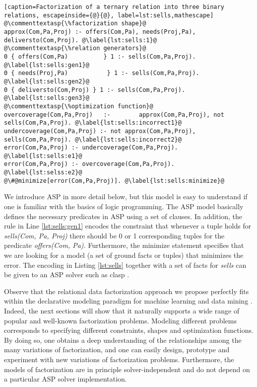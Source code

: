 \begin{lstlisting}[caption=Factorization of a ternary relation into three binary relations, escapeinside={@}{@}, label=lst:sells,mathescape] 
@\commenttextasp{\%factorization shape}@
approx(Com,Pa,Proj) :- offers(Com,Pa), needs(Proj,Pa), deliversto(Com,Proj). @\label{lst:sells:1}@
@\commenttextasp{\%relation generators}@
0 { offers(Com,Pa)          } 1 :- sells(Com,Pa,Proj). @\label{lst:sells:gen1}@
0 { needs(Proj,Pa)           } 1 :- sells(Com,Pa,Proj). @\label{lst:sells:gen2}@
0 { deliversto(Com,Proj) } 1 :- sells(Com,Pa,Proj). @\label{lst:sells:gen3}@
@\commenttextasp{\%optimization function}@
overcoverage(Com,Pa,Proj)   :-        approx(Com,Pa,Proj), not sells(Com,Pa,Proj). @\label{lst:sells:incorrect1}@
undercoverage(Com,Pa,Proj) :- not approx(Com,Pa,Proj),        sells(Com,Pa,Proj). @\label{lst:sells:incorrect2}@
error(Com,Pa,Proj) :- undercoverage(Com,Pa,Proj). @\label{lst:sells:e1}@
error(Com,Pa,Proj) :- overcoverage(Com,Pa,Proj). @\label{lst:selss:e2}@
@\#@minimize[error(Com,Pa,Proj)]. @\label{lst:sells:minimize}@
\end{lstlisting}

We introduce ASP in more detail below, but this model is easy to understand if one is familiar with the basics of logic programming. The ASP model basically defines the necessary predicates in ASP using a set of clauses. In addition, the rule in Line \ref{lst:sells:gen1} encodes the constraint that whenever a tuple holds for \textit{sells(Com, Pa, Proj)}
there should be 0 or 1 corresponding tuples for the predicate \textit{offers(Com, Pa).}
Furthermore, the minimize statement specifies that we are looking for a model (a set of ground facts or tuples) that minimizes the error.  The encoding in Listing  \ref{lst:sells} together with a set of facts for \textit{sells}
can be given to an ASP solver such as clasp \citep{gebser2011potassco}. %


Observe that the relational data factorization approach we propose perfectly fits within the declarative modeling paradigm for machine learning and data mining \citep{DeRaedtECML12}.  Indeed, the next sections will show that it naturally supports a wide range of popular and well-known factorization problems. 
Modeling different problems corresponds to specifying different constraints, shapes and optimization functions.
By doing so, one obtains a deep understanding of the relationships among the many variations of factorization, 
and one can easily design, prototype and experiment with new variations of factorization problems. 
Furthermore, the models of factorization are in principle solver-independent and do not depend on a particular ASP solver implementation.   

